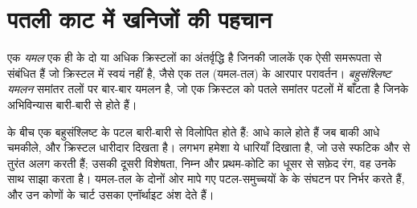 \section{पतली काट में खनिजों की पहचान}

\begin{definition}\label{def:b1:optical-mineralogy:twin}
एक \emph{यमल} एक ही  के दो या अधिक क्रिस्टलों का अंतर्वृद्धि है जिनकी जालकें एक ऐसी समरूपता
से संबंधित हैं जो क्रिस्टल में स्वयं नहीं है, जैसे एक तल (यमल-तल) के आरपार परावर्तन। \emph{बहुसंश्लिष्ट यमलन}
समांतर तलों पर बार-बार यमलन है, जो एक क्रिस्टल को पतले समांतर पटलों में बाँटता है जिनके अभिविन्यास बारी-बारी से होते हैं।
\end{definition}

 के बीच एक बहुसंश्लिष्ट  के पटल बारी-बारी से विलोपित होते हैं: आधे काले होते हैं जब बाकी आधे चमकीले,
और क्रिस्टल धारीदार दिखता है।  लगभग हमेशा ये धारियाँ दिखाता है, जो उसे स्फटिक और  से
तुरंत अलग करती हैं; उसकी दूसरी विशेषता, निम्न  और प्रथम-कोटि का धूसर से सफ़ेद रंग, वह उनके साथ साझा करता है। यमल-तल
के दोनों ओर मापे गए पटल-समुच्चयों के   के संघटन पर निर्भर करते हैं, और उन कोणों के चार्ट
उसका एनॉर्थाइट अंश देते हैं।


